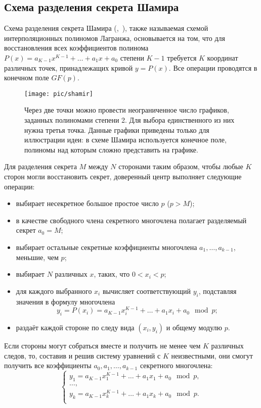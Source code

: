 \subsection[Схема Шамира]{Схема разделения секрета Шамира}

Схема разделения секрета Шамира (,~\cite{Shamir:1979}), также называемая схемой интерполяционных полиномов Лагранжа, основывается на том, что для восстановления всех коэффициентов полинома $P(x) = a_{K-1}x^{K-1} + \dots + a_1 x + a_0$ степени $K-1$ требуется $K$ координат различных точек, принадлежащих кривой $y=P(x)$. Все операции проводятся в конечном поле $GF(p)$.

\begin{figure}
	\centering
	\texttt{[image: pic/shamir]}
  \caption{Через две точки можно провести неограниченное число графиков, заданных полиномами степени 2. Для выбора единственного из них нужна третья точка. Данные графики приведены только для иллюстрации идеи: в схеме Шамира используется конечное поле, полиномы над которым сложно представить на графике.}
  \label{fig:shamir}
\end{figure}

Для разделения секрета $M$ между $N$ сторонами таким образом, чтобы любые $K$ сторон могли восстановить секрет, доверенный центр выполняет следующие операции:
\begin{itemize}
	\item выбирает несекретное большое простое число $p$ ($p > M$);
	\item в качестве свободного члена секретного многочлена полагает разделяемый секрет $a_0 = M$;
	\item выбирает остальные секретные коэффициенты многочлена $a_1, \dots, a_{k-1}$, меньшие, чем $p$;
	\item выбирает $N$ различных $x$, таких, что $0 < x_i < p$;
	\item для каждого выбранного $x_i$ вычисляет соответствующий $y_i$, подставляя значения в формулу многочлена
		\[ y_i = P( x_i ) = a_{K-1}x_i^{K-1} + \dots + a_1 x_i + a_0 \mod p ;\]
	\item раздаёт каждой стороне по следу вида $(x_i, y_i)$ и общему модулю $p$.
\end{itemize}

Если стороны могут собраться вместе и получить не менее чем $K$ различных следов, то, составив и решив систему уравнений с $K$ неизвестными, они смогут получить все коэффициенты $a_0, a_1, \dots, a_{k-1}$ секретного многочлена:
\[ \left\{ \begin{array}{l}
    y_1 = a_{K-1}x_1^{K-1} + \dots + a_1 x_1 + a_0 \mod p, \\
    \dots, \\
    y_k = a_{K-1}x_k^{K-1} + \dots + a_1 x_k + a_0 \mod p. \\
\end{array} \right. \]

